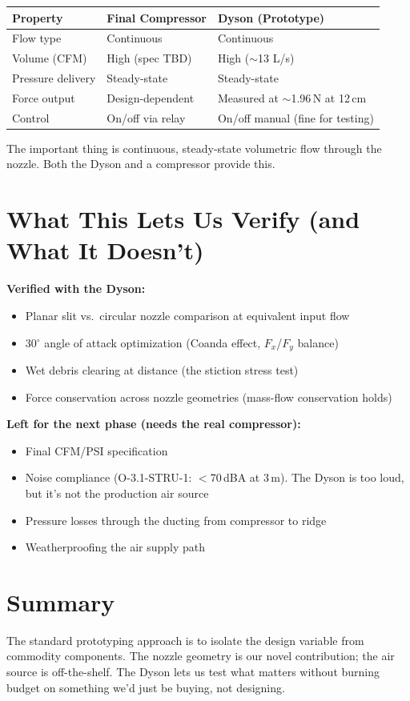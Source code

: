 \documentclass[12pt, letterpaper]{article}
\begin{document}
\begin{table}[h]
\centering\small
\begin{tabular}{@{}lll@{}}
\toprule
\textbf{Property} & \textbf{Final Compressor} & \textbf{Dyson (Prototype)} \\
\midrule
Flow type & Continuous & Continuous \\
Volume (CFM) & High (spec TBD) & High ($\sim$13 L/s) \\
Pressure delivery & Steady-state & Steady-state \\
Force output & Design-dependent & Measured at $\sim$1.96\,N at 12\,cm \\
Control & On/off via relay & On/off manual (fine for testing) \\
\bottomrule
\end{tabular}
\end{table}

The important thing is continuous, steady-state volumetric flow through the nozzle. Both the Dyson and a compressor provide this.

\section{What This Lets Us Verify (and What It Doesn't)}

\textbf{Verified with the Dyson:}
\begin{itemize}
    \item Planar slit vs.\ circular nozzle comparison at equivalent input flow
    \item 30$^\circ$ angle of attack optimization (Coanda effect, $F_x$/$F_y$ balance)
    \item Wet debris clearing at distance (the stiction stress test)
    \item Force conservation across nozzle geometries (mass-flow conservation holds)
\end{itemize}

\textbf{Left for the next phase (needs the real compressor):}
\begin{itemize}
    \item Final CFM/PSI specification
    \item Noise compliance (O-3.1-STRU-1: $<$70\,dBA at 3\,m). The Dyson is too loud, but it's not the production air source
    \item Pressure losses through the ducting from compressor to ridge
    \item Weatherproofing the air supply path
\end{itemize}

\section{Summary}

The standard prototyping approach is to isolate the design variable from commodity components. The nozzle geometry is our novel contribution; the air source is off-the-shelf. The Dyson lets us test what matters without burning budget on something we'd just be buying, not designing.
\end{document}
